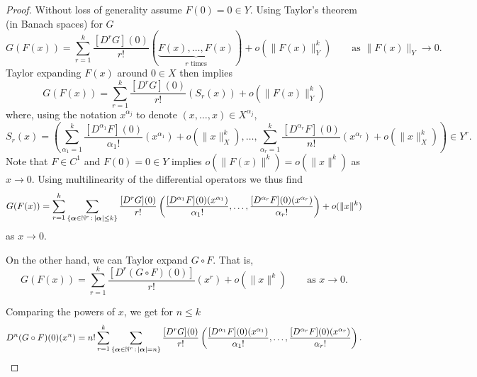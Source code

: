 \begin{proof}
  
  Without loss of generality assume
  $F(0) = 0\in Y$.
    Using Taylor's theorem (in Banach spaces) for $G$
  \begin{equation*}
    G(F(x)) =  \sum_{r=1}^k\frac{[D^rG](0)}{r!}({\underbrace{F(x),\ldots, F(x)}_\text{$r$ times}}) + o(\|F(x)\|_Y^k)\qquad\text{as }\|F(x)\|_Y\to 0.
  \end{equation*}
Taylor expanding $F(x)$ around $0\in X$ then implies
\begin{equation*}
  G(F(x)) =  \sum_{r=1}^k\frac{[D^rG](0)}{r!}(S_r(x))+ o(\|F(x)\|_Y^k)
\end{equation*}
where, using the notation $x^{\alpha_j}$ to denote $(x,\dots,x)\in X^{\alpha_j}$,
\begin{equation*}
  S_r(x)=
  \left(\sum_{\alpha_1=1}^k\frac{[D^{\alpha_1}F](0)}{\alpha_1!}(x^{\alpha_1}) + o(\|x\|_X^k),\ldots, \sum_{\alpha_r= 1}^k\frac{[D^{\alpha_r}F](0)}{n!}(x^{\alpha_r})+
  o(\|x\|_X^k)\right)\in Y^r.
\end{equation*}
Note that $F\in C^1$ and $F(0)=0\in Y$ implies
$o(\|F(x)\|^k) = o(\|x\|^k)$ as $x\to 0$.  Using multilinearity of the
differential operators we thus find
\begin{equation*}
  G(F(x)) = \sum_{r=1}^k\sum_{\{{\boldsymbol \alpha}\in \mathbb{N}^r\, :\,|{\boldsymbol \alpha}|\le k \}}
  \frac{[D^rG](0)}{r!}
  \left(\frac{[D^{\alpha_1}F](0)(x^{\alpha_1})}{\alpha_1!},\dots,\frac{[D^{\alpha_r}F](0)(x^{\alpha_r})}{\alpha_r!}\right) + o(\|x\|^k)
\end{equation*}
as $x\to 0$.

On the other hand, we can Taylor expand $G\circ F$. That is,
\begin{equation*}
  G(F(x)) = \sum_{r = 1}^k\frac{[D^r(G\circ F)(0)]}{r!}(x^r) + o(\|x\|^k)\qquad\text{as }x\to 0.
\end{equation*}

Comparing the powers of $x$, we get for $n\le k$
\begin{equation*}\label{eq:FdB2}
  D^n(G\circ F)(0)(x^n) = n!\sum_{r=1}^k
  \sum_{\{{\boldsymbol \alpha}\in\mathbb{N}^r\, :\,|{\boldsymbol \alpha}|=n \}}
  \frac{[D^rG](0)}{r!}
  \left(\frac{[D^{\alpha_1}F](0)(x^{\alpha_1})}{\alpha_1!},\dots,\frac{[D^{\alpha_r}F](0)(x^{\alpha_r})}{\alpha_r!}\right).
\end{equation*}



\end{proof}
